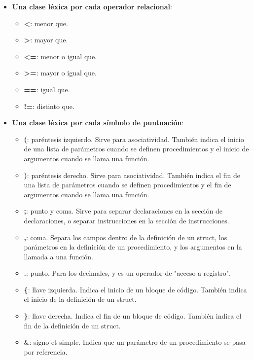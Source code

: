 \documentclass[11pt]{article}
\begin{document}
\begin{itemize}
\begin{itemize}
            \end{itemize}
            \item \textbf{Una clase léxica por cada operador relacional}:
            \begin{itemize}
                \item \textbf{\textless}: menor que.
                \item \textbf{\textgreater}: mayor que.
                \item \textbf{\textless=}: menor o igual que.
                \item \textbf{\textgreater=}: mayor o igual que.
                \item \textbf{==}: igual que.
                \item \textbf{!=}: distinto que.
            \end{itemize}
            \item \textbf{Una clase léxica por cada símbolo de puntuación}:
            \begin{itemize}
                \item \textbf{(}: paréntesis izquierdo. Sirve para asociatividad. También indica el inicio de una lista de parámetros cuando se definen procedimientos y el inicio de argumentos cuando se llama una función.
                \item \textbf{)}: paréntesis derecho. Sirve para asociatividad. También indica el fin de una lista de parámetros cuando se definen procedimientos y el fin de argumentos cuando se llama una función.
                \item \textbf{;}: punto y coma. Sirve para separar declaraciones en la sección de declaraciones, o separar instrucciones en la sección de instrucciones.
                \item \textbf{,}: coma. Separa los campos dentro de la definición de un struct, los parámetros en la definición de un procedimiento, y los argumentos en la llamada a una función.
                \item \textbf{.}: punto. Para los decimales, y es un operador de "acceso a registro".
                \item \textbf{\{}: llave izquierda. Indica el inicio de un bloque de código. También indica el inicio de la definición de un struct.
                \item \textbf{\}}: llave derecha. Indica el fin de un bloque de código. También indica el fin de la definición de un struct.
                \item \textbf{$\&$}: signo et simple. Indica que un parámetro de un procedimiento se pasa por referencia.

\end{itemize}
\end{itemize}
\end{document}
